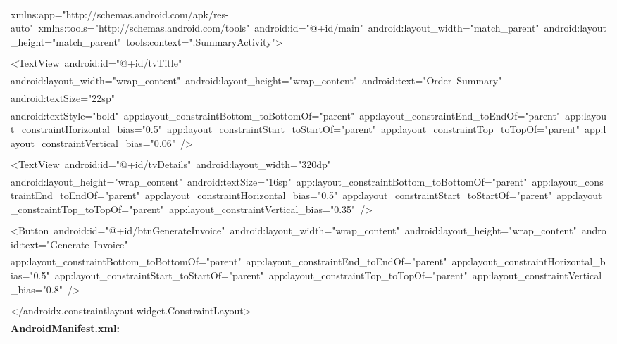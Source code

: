 \documentclass[a4paper,12pt]{article}
\begin{document}
\begin{longtable}{|p{}|}
{\ttfamily\small xmlns:app="http://schemas.android.com/apk/res-auto"\ xmlns:tools="http://schemas.android.com/tools"\ android:id="@+id/main"\ android:layout\_width="match\_parent"\ android:layout\_height="match\_parent"\ tools:context=".SummaryActivity"\textgreater{}} \\
\strut \\
{\ttfamily\small \textless{}TextView\ android:id="@+id/tvTitle"} \\
{\ttfamily\small android:layout\_width="wrap\_content"\ android:layout\_height="wrap\_content"\ android:text="Order\ Summary"} \\
{\ttfamily\small android:textSize="22sp"} \\
{\ttfamily\small android:textStyle="bold"\ app:layout\_constraintBottom\_toBottomOf="parent"\ app:layout\_constraintEnd\_toEndOf="parent"\ app:layout\_constraintHorizontal\_bias="0.5"\ app:layout\_constraintStart\_toStartOf="parent"\ app:layout\_constraintTop\_toTopOf="parent"\ app:layout\_constraintVertical\_bias="0.06"\ /\textgreater{}} \\
\strut \\
{\ttfamily\small \textless{}TextView\ android:id="@+id/tvDetails"\ android:layout\_width="320dp"} \\
{\ttfamily\small android:layout\_height="wrap\_content"\ android:textSize="16sp"\ app:layout\_constraintBottom\_toBottomOf="parent"\ app:layout\_constraintEnd\_toEndOf="parent"\ app:layout\_constraintHorizontal\_bias="0.5"\ app:layout\_constraintStart\_toStartOf="parent"\ app:layout\_constraintTop\_toTopOf="parent"\ app:layout\_constraintVertical\_bias="0.35"\ /\textgreater{}} \\
\strut \\
{\ttfamily\small \textless{}Button\ android:id="@+id/btnGenerateInvoice"\ android:layout\_width="wrap\_content"\ android:layout\_height="wrap\_content"\ android:text="Generate\ Invoice"} \\
{\ttfamily\small app:layout\_constraintBottom\_toBottomOf="parent"\ app:layout\_constraintEnd\_toEndOf="parent"\ app:layout\_constraintHorizontal\_bias="0.5"\ app:layout\_constraintStart\_toStartOf="parent"\ app:layout\_constraintTop\_toTopOf="parent"\ app:layout\_constraintVertical\_bias="0.8"\ /\textgreater{}} \\
\strut \\
{\ttfamily\small \textless{}/androidx.constraintlayout.widget.ConstraintLayout\textgreater{}} \\
\hline
\rule{0pt}{13pt}\textbf{AndroidManifest.xml:} \\

\end{longtable}
\end{document}

